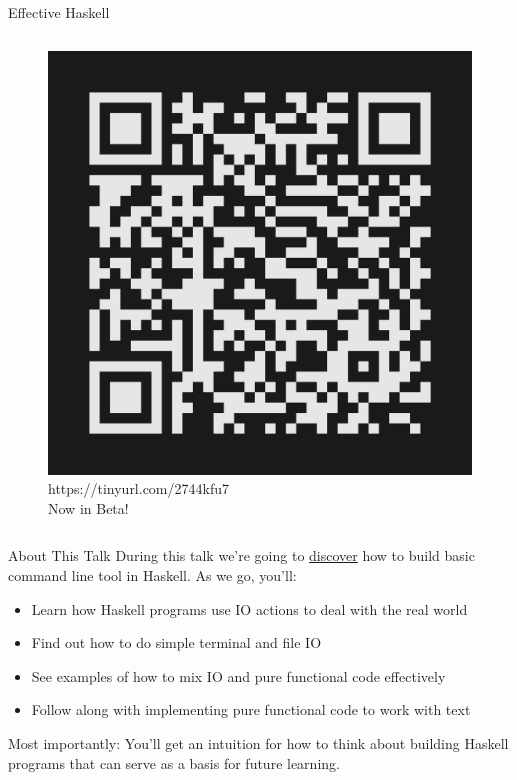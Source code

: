 \documentclass[10pt, presentation, colorlinks]{beamer}
\begin{document}
\begin{frame}[label={sec:orgafb926b}]{Effective Haskell}
\begin{columns}
\begin{column}[t]{0.45\columnwidth}
\begin{figure}[htbp]
\centering
\includegraphics[height=0.3\textheight]{img/effective-haskell-url.png}
{\tiny{https://tinyurl.com/2744kfu7\\ Now in Beta!}}
\end{figure}
\end{column}
\end{columns}
\end{frame}

\begin{frame}[label={sec:orgf8c53fa}]{About This Talk}
During this talk we're going to \uline{discover} how to build basic command
line tool in Haskell. As we go, you'll:

\bigskip

\begin{itemize}
\item Learn how Haskell programs use IO actions to deal with the real world
\item Find out how to do simple terminal and file IO
\item See examples of how to mix IO and pure functional code effectively
\item Follow along with implementing pure functional code to work with text
\end{itemize}

\bigskip

\alert{Most importantly}: You'll get an intuition for how to think about
building Haskell programs that can serve as a basis for future
learning.
\end{frame}
\end{document}
